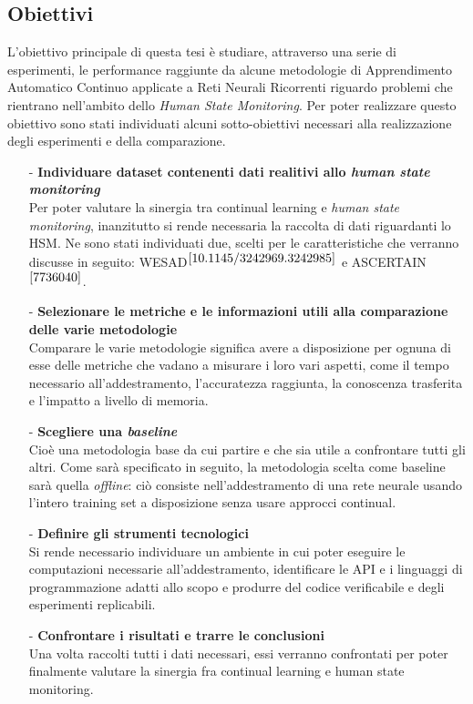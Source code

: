 \subsection*{Obiettivi}
L'obiettivo principale di questa tesi è studiare, attraverso una serie di esperimenti, le performance raggiunte da alcune metodologie di Apprendimento Automatico Continuo applicate a Reti Neurali Ricorrenti riguardo problemi che rientrano nell'ambito dello \textit{Human State Monitoring}. Per poter realizzare questo obiettivo sono stati individuati alcuni sotto-obiettivi necessari alla realizzazione degli esperimenti e della comparazione.
\begin{itemize}
    \item[-] \textbf{Individuare dataset contenenti dati realitivi allo \textit{human state monitoring}}\\
    Per poter valutare la sinergia tra continual learning e \textit{human state monitoring}, inanzitutto si rende necessaria la raccolta di dati riguardanti lo HSM. Ne sono stati individuati due, scelti per le caratteristiche che verranno discusse in seguito: WESAD$^{\cite{10.1145/3242969.3242985}}$ e ASCERTAIN$^{\cite{7736040}}$.
    \item[-] \textbf{Selezionare le metriche e le informazioni utili alla comparazione delle varie metodologie}\\
    Comparare le varie metodologie significa avere a disposizione per ognuna di esse delle metriche che vadano a misurare i loro vari aspetti, come il tempo necessario all'addestramento, l'accuratezza raggiunta, la conoscenza trasferita e l'impatto a livello di memoria.
    \item[-] \textbf{Scegliere una \textit{baseline}}\\
    Cioè una metodologia base da cui partire e che sia utile a confrontare tutti gli altri. Come sarà specificato in seguito, la metodologia scelta come baseline sarà quella \textit{offline}: ciò consiste nell'addestramento di una rete neurale usando l'intero training set a disposizione senza usare approcci continual.
    \item[-] \textbf{Definire gli strumenti tecnologici}\\
    Si rende necessario individuare un ambiente in cui poter eseguire le computazioni necessarie all'addestramento, identificare le API e i linguaggi di programmazione adatti allo scopo e produrre del codice verificabile e degli esperimenti replicabili.
    \item[-] \textbf{Confrontare i risultati e trarre le conclusioni}\\
    Una volta raccolti tutti i dati necessari, essi verranno confrontati per poter finalmente valutare la sinergia fra continual learning e human state monitoring.
\end{itemize}
\pagebreak
